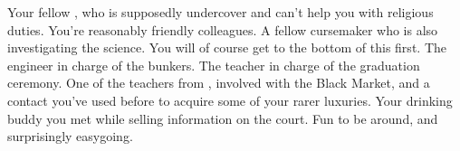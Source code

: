 \documentclass[char]{GL2020}
\begin{document}
\begin{contacts}
	\contact{\cInterpol{}} Your fellow \cInterpol{\cleric}, who is supposedly undercover and can’t help you with religious duties. You’re reasonably friendly colleagues.
	\contact{\cCurse{}} A fellow cursemaker who is also investigating the \pTech{} science. You will of course get to the bottom of this first.
	\contact{\cBunker{}} The \pShip{} engineer in charge of the bunkers.
	\contact{\cMusic{}} The teacher in charge of the graduation ceremony.
	\contact{\cChupInventor{}} One of the teachers from \pTech{}, involved with the Black Market, and a contact you’ve used before to acquire some of your rarer luxuries.
	\contact{\cWildCard{}} Your drinking buddy you met while selling information on the court. Fun to be around, and surprisingly easygoing.
\end{contacts}
\end{document}
